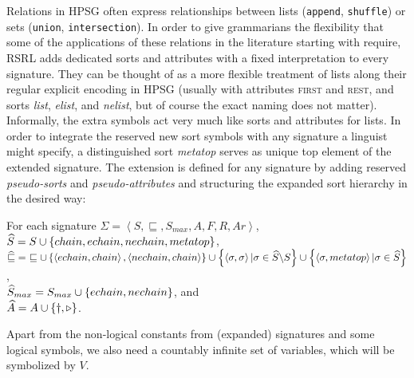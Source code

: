 \documentclass[output=paper
                ,modfonts
                ,nonflat
	        ,collection
	        ,collectionchapter
	        ,collectiontoclongg
 	        ,biblatex
                ,babelshorthands
                ,newtxmath
                ,draftmode
                ,colorlinks, citecolor=brown
]{./langsci/langscibook}
\begin{document}
{Relations in HPSG often express relationships between
lists (\texttt{append}, \texttt{shuffle}) or sets (\texttt{union},
\texttt{intersection}). In order to give grammarians the flexibility
that some of the applications of these relations in the literature
starting with \citet{PollardSag1994} require, RSRL adds
dedicated sorts and attributes with a fixed interpretation to every signature.
They can be thought of as a more flexible treatment of lists along their
regular explicit encoding in HPSG (usually with attributes \textsc{first} and
\textsc{rest}, and sorts \textit{list}, \textit{elist}, and
\textit{nelist}, but of course the exact naming does not matter).
Informally, the extra symbols act very much like sorts and attributes for
lists. In order to integrate the reserved new sort symbols with any
signature a linguist might specify, a distinguished sort \textit{metatop} serves as unique
top element of the extended signature. The extension is defined for
any signature by adding reserved \emph{pseudo-sorts} and \emph{pseudo-attributes}
and structuring the expanded sort hierarchy in the desired way:

\begin{mydef}\label{def-sig-chains}
For each signature $\Sigma=\left<S,\sqsubseteq,S_{max},A,F,R,Ar\right>$,\\
$\widehat{S}= S \cup \left\{\mit{chain, echain, nechain, metatop}\right\}$,\\
$\Aug\sqsubseteq=\ \sqsubseteq\cup\left\{\left<\mathit{echain},\mathit{chain}\right>,\left<\mathit{nechain},\mathit{chain}\right>\right\}\cup\left\{\left<\sigma,\sigma\right>|\sigma\in\Aug{S}\backslash S\right\}\cup\left\{\left<\sigma,\mathit{metatop}\right>|\sigma\in\Aug{S}\right\}$,\\
$\widehat{S}_{max}=S_{max}\cup\left\{\mit{echain},\mit{nechain}\right\}$, and\\
$\widehat{A}=A\cup\left\{\dagger,\triangleright\right\}$.
\end{mydef}

Apart from the non-logical constants from (expanded) signatures and
some logical symbols, we also need a countably infinite set of
variables, which will be symbolized by $V$.


}
\end{document}
